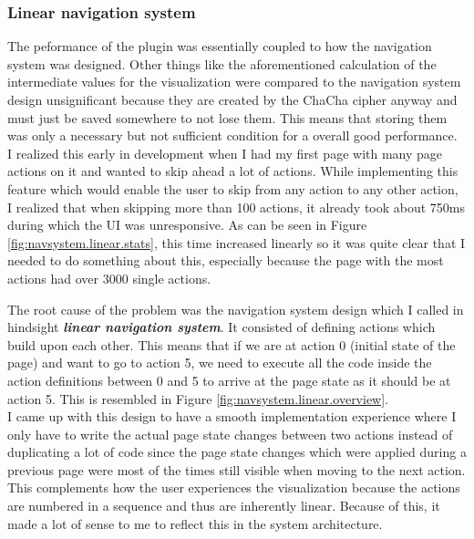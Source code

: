 \subsubsection{Linear navigation system}

The peformance of the plugin was essentially coupled to how the navigation system was designed. Other things like the aforementioned calculation of the intermediate values for the visualization were compared to the navigation system design unsignificant because they are created by the ChaCha cipher anyway and must just be saved somewhere to not lose them. This means that storing them was only a necessary but not sufficient condition for a overall good performance. \\
I realized this early in development when I had my first page with many page actions on it and wanted to skip ahead a lot of actions. While implementing this feature which would enable the user to skip from any action to any other action, I realized that when skipping more than 100 actions, it already took about 750ms during which the UI was unresponsive. As can be seen in Figure \ref{fig:navsystem.linear.stats}, this time increased linearly so it was quite clear that I needed to do something about this, especially because the page with the most actions had over 3000 single actions.

The root cause of the problem was the navigation system design which I called in hindsight \textbf{\textit{linear navigation system}}. It consisted of defining actions which build upon each other. This means that if we are at action 0 (initial state of the page) and want to go to action 5, we need to execute all the code inside the action definitions between 0 and 5 to arrive at the page state as it should be at action 5. This is resembled in Figure \ref{fig:navsystem.linear.overview}. \\
I came up with this design to have a smooth implementation experience where I only have to write the actual page state changes between two actions instead of duplicating a lot of code since the page state changes which were applied during a previous page were most of the times still visible when moving to the next action. This complements how the user experiences the visualization because the actions are numbered in a sequence and thus are inherently linear. Because of this, it made a lot of sense to me to reflect this in the system architecture.

